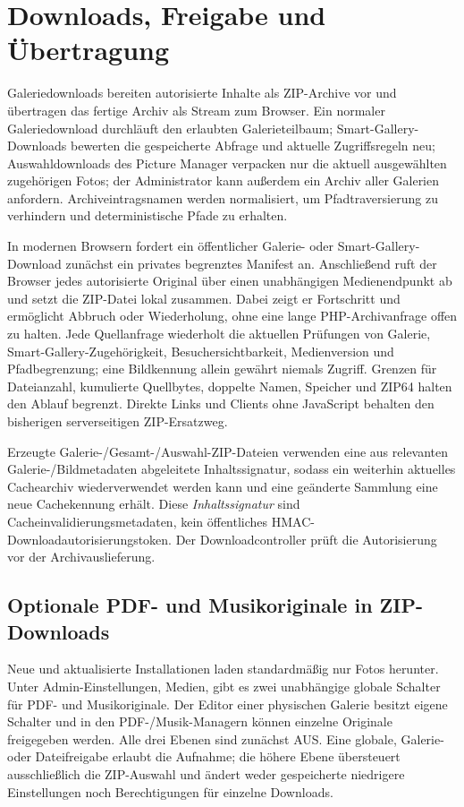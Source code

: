\documentclass[11pt,a4paper]{article}
\begin{document}
\section{Downloads, Freigabe und Übertragung}
\label{sec:sharing}

Galeriedownloads bereiten autorisierte Inhalte als ZIP-Archive vor und
übertragen das fertige Archiv als Stream zum Browser. Ein normaler
Galeriedownload durchläuft den erlaubten Galerieteilbaum;
Smart-Gallery-Downloads bewerten die gespeicherte Abfrage und aktuelle
Zugriffsregeln neu; Auswahldownloads des Picture Manager verpacken nur die
aktuell ausgewählten zugehörigen Fotos; der Administrator kann außerdem ein
Archiv aller Galerien anfordern. Archiveintragsnamen werden normalisiert, um
Pfadtraversierung zu verhindern und deterministische Pfade zu erhalten.

In modernen Browsern fordert ein öffentlicher Galerie- oder
Smart-Gallery-Download zunächst ein privates begrenztes Manifest an.
Anschließend ruft der Browser jedes autorisierte Original über einen
unabhängigen Medienendpunkt ab und setzt die ZIP-Datei lokal zusammen. Dabei
zeigt er Fortschritt und ermöglicht Abbruch oder Wiederholung, ohne eine lange
PHP-Archivanfrage offen zu halten. Jede Quellanfrage wiederholt die aktuellen
Prüfungen von Galerie, Smart-Gallery-Zugehörigkeit, Besuchersichtbarkeit,
Medienversion und Pfadbegrenzung; eine Bildkennung allein gewährt niemals
Zugriff. Grenzen für Dateianzahl, kumulierte Quellbytes, doppelte Namen,
Speicher und ZIP64 halten den Ablauf begrenzt. Direkte Links und Clients ohne
JavaScript behalten den bisherigen serverseitigen ZIP-Ersatzweg.

Erzeugte Galerie-/Gesamt-/Auswahl-ZIP-Dateien verwenden eine aus relevanten
Galerie-/Bildmetadaten abgeleitete Inhaltssignatur, sodass ein weiterhin
aktuelles Cachearchiv wiederverwendet werden kann und eine geänderte Sammlung
eine neue Cachekennung erhält. Diese \emph{Inhaltssignatur} sind
Cacheinvalidierungsmetadaten, kein öffentliches
HMAC-Downloadautorisierungstoken. Der Downloadcontroller prüft die Autorisierung
vor der Archivauslieferung.

\subsection{Optionale PDF- und Musikoriginale in ZIP-Downloads}
Neue und aktualisierte Installationen laden standardmäßig nur Fotos herunter.
Unter Admin-Einstellungen, Medien, gibt es zwei unabhängige globale Schalter für
PDF- und Musikoriginale. Der Editor einer physischen Galerie besitzt eigene
Schalter und in den PDF-/Musik-Managern können einzelne Originale freigegeben
werden. Alle drei Ebenen sind zunächst AUS. Eine globale, Galerie- oder
Dateifreigabe erlaubt die Aufnahme; die höhere Ebene übersteuert ausschließlich
die ZIP-Auswahl und ändert weder gespeicherte niedrigere Einstellungen noch
Berechtigungen für einzelne Downloads.
\end{document}
